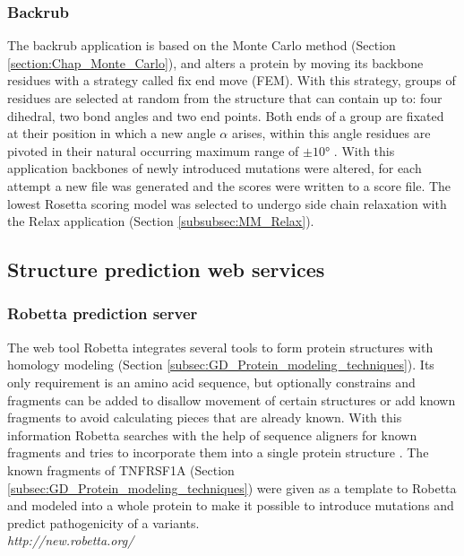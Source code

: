 \subsubsection{Backrub}
The backrub application is based on the Monte Carlo method (Section \ref{section:Chap_Monte_Carlo}), and alters a protein by moving its backbone residues with a strategy called fix end move (FEM). 
With this strategy, groups of residues are selected at random from the structure that can contain up to: four dihedral, two bond angles and two end points. 
Both ends of a group are fixated at their position in which a new angle $\alpha$ arises, within this angle residues are pivoted in their natural occurring maximum range of $\pm \ang{10}$ \cite{betancourt_efficient_2005, smith_backrub_nodate}.
With this application backbones of newly introduced mutations were altered, for each attempt a new file was generated and the scores were written to a score file. The lowest Rosetta scoring model was selected to undergo side chain relaxation with the Relax application (Section \ref{subsubsec:MM_Relax}).
\label{subsubsec:MM_Backrub}

\subsection{Structure prediction web services}

\subsubsection{Robetta prediction server}
The web tool Robetta integrates several tools to form protein structures with homology modeling (Section \ref{subsec:GD_Protein_modeling_techniques}).
Its only requirement is an amino acid sequence, but optionally constrains and fragments can be added to disallow movement of certain structures or add known fragments to avoid calculating pieces that are already known. With this information Robetta searches with the help of sequence aligners for known fragments and tries to incorporate them into a single protein structure \cite{song_high-resolution_2013,soding_protein_2005,kallberg_template-based_2012,yang_improving_2011,ovchinnikov_protein_2017}.
The known fragments of TNFRSF1A (Section \ref{subsec:GD_Protein_modeling_techniques}) were given as a template to Robetta and modeled into a whole protein to make it possible to introduce mutations and predict pathogenicity of a variants.\\
\label{subsec:MM_Robetta}
\textit{http://new.robetta.org/}

